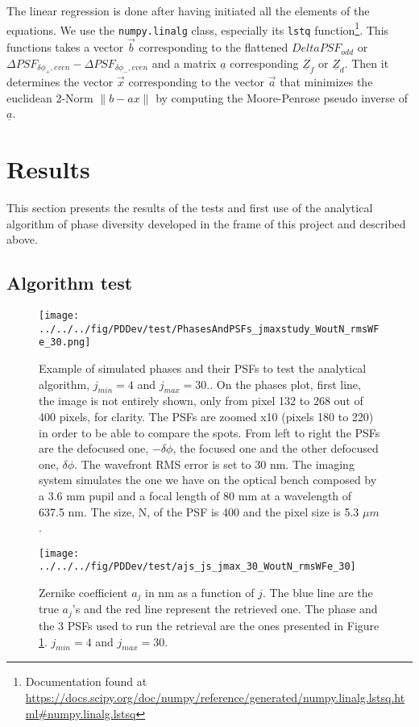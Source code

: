 The linear regression is done after having initiated all the elements of the equations. We use the \verb!numpy.linalg! class, especially its \verb!lstq! function\footnote{Documentation found at \url{https://docs.scipy.org/doc/numpy/reference/generated/numpy.linalg.lstsq.html\#numpy.linalg.lstsq}}. This functions takes a vector $\vec{b}$ corresponding to the flattened $Delta PSF_{odd}$ or $\Delta PSF_{\delta\phi_+, even}-\Delta PSF_{\delta\phi_-, even}$ and a matrix  $\underline{a}$ corresponding $\underline{Z}_f$ or $\underline{Z}_d$. Then it determines the vector $\vec{x}$ corresponding to the vector $\vec{a}$ that minimizes the euclidean 2-Norm $\lVert b-ax \rVert$ by computing the Moore-Penrose pseudo inverse of $\underline{a}$.

\section{Results}
\label{sec:ourPDresult}

This section presents the results of the tests and first use of the analytical algorithm of phase diversity developed in the frame of this project and described above.

\subsection{Algorithm test}

\begin{figure}
\begin{center}
\texttt{[image: ../../../fig/PDDev/test/PhasesAndPSFs\_jmaxstudy\_WoutN\_rmsWFe\_30.png]}
\decoRule
\caption{Example of simulated phases and their PSFs to test the analytical algorithm, $j_{min}=4$ and $j_{max}=30$.. On the phases plot, first line, the image is not entirely shown, only from pixel 132 to 268 out of 400 pixels, for clarity. The PSFs are zoomed x10 (pixels 180 to 220) in order to be able to compare the spots. From left to right the PSFs are the defocused one, $-\delta\phi$, the focused one and the other defocused one, $\delta\phi$. The wavefront RMS error is set to 30 nm. The imaging system simulates the one we have on the optical bench composed by a 3.6 mm pupil and a focal length of 80 mm at a wavelength of 637.5 nm. The size, N, of the PSF is 400 and the pixel size is 5.3 $\mu m$.}
\label{fig:simPhasesAndPSFs}
\end{center}
\end{figure}
 

\begin{figure}
\begin{center}
\texttt{[image: ../../../fig/PDDev/test/ajs\_js\_jmax\_30\_WoutN\_rmsWFe\_30]}
\decoRule
\caption{Zernike coefficient $a_j$ in nm as a function of $j$. The blue line are the true $a_j$'s and the red line represent the retrieved one. The phase and the 3 PSFs used to run the retrieval are the ones presented in Figure \ref{fig:simPhasesAndPSFs}. $j_{min}=4$ and $j_{max}=30$.}
\label{fig:ajs_js_jmax_30_WoutN_rmsWFe_30}
\end{center}
\end{figure} 

